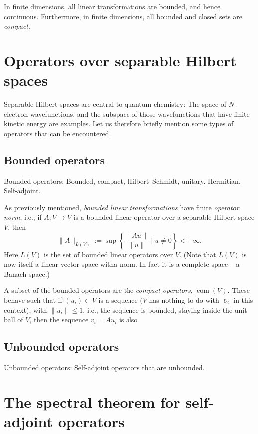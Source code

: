 In finite dimensions, all linear transformations are bounded, and hence continuous. Furthermore, in finite dimensions, all bounded and closed sets are \emph{compact}.

\section{Operators over separable Hilbert spaces}
\label{sec:operators over hilbert space}

Separable Hilbert spaces are central to quantum chemistry: The space of $N$-electron wavefunctions, and the subspace of those wavefunctions that have finite kinetic energy are examples. Let us therefore briefly mention some types of operators that can be encountered.

\subsection{Bounded operators}
Bounded operators: Bounded, compact, Hilbert--Schmidt, unitary. Hermitian. Self-adjoint.

As previously mentioned, \emph{bounded linear transformations} have finite \emph{operator norm}, i.e., if $A : V \to V$ is a bounded linear operator over a separable Hilbert space $V$, then
\begin{equation}
\|A\|_{L(V)} := \sup\left\{ \frac{\|Au\|}{\|u\|} \mid u \neq 0  \right\} < +\infty.
\end{equation}
Here $L(V)$ is the set of bounded linear operators over $V$. (Note that $L(V)$ is now itself a linear vector space witha norm. In fact it is a complete space -- a Banach space.)

A subset of the bounded operators are the \emph{compact operators}, $\operatorname{com}(V)$. These behave such that if $(u_i) \subset V$ is a sequence ($V$ has nothing to do with $\ell_2$ in this context), with $\|u_i\|\leq 1$, i.e., the sequence is bounded, staying inside the unit ball of $V$, then the sequence $v_i = Au_i$ is also 


\subsection{Unbounded operators}
Unbounded operators: Self-adjoint operators that are unbounded.

\section{The spectral theorem for self-adjoint operators}
\label{sec:spectral theorem}


